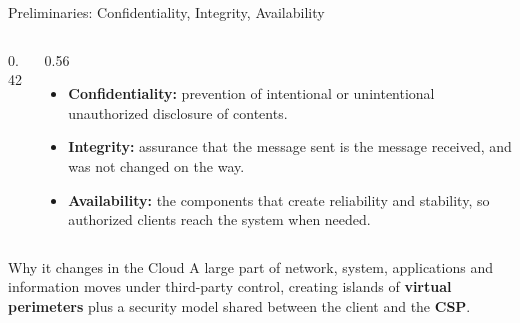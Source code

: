 \documentclass[11pt,aspectratio=169]{beamer}
\newcommand{\kw}[1]{\textbf{\color{accent}#1}}
\begin{document}
\begin{frame}{Preliminaries: Confidentiality, Integrity, Availability}
  \begin{columns}[T,onlytextwidth]
    \begin{column}{0.42\textwidth}
      \centering
      \vspace{0.5em}
    \end{column}
    \begin{column}{0.56\textwidth}
      \small
      \begin{itemize}\setlength{\itemsep}{0.7em}
        \item \kw{Confidentiality:} prevention of intentional or unintentional
              unauthorized disclosure of contents.
        \item \kw{Integrity:} assurance that the message sent is the message
              received, and was not changed on the way.
        \item \kw{Availability:} the components that create reliability and
              stability, so authorized clients reach the system when needed.
      \end{itemize}
    \end{column}
  \end{columns}
  \vspace{0.3em}
  \begin{block}{Why it changes in the Cloud}
    \footnotesize
    A large part of network, system, applications and information moves under
    third-party control, creating islands of \kw{virtual perimeters} plus a
    security model shared between the client and the \kw{CSP}.
  \end{block}
\end{frame}
\end{document}
